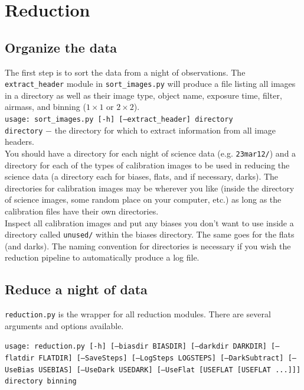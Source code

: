 \documentclass{article}
\begin{document}
\vspace{3 mm}
\section{Reduction}
\subsection{Organize the data}
The first step is to sort the data from a night of observations. 
The \texttt{extract\_header} module in \texttt{sort\_images.py} will
produce a file listing all images in a directory as well as their
image type, object name, exposure time, filter, airmass, and binning 
($1\times1$ or $2\times2$).\\

\texttt{usage: sort\_images.py [-h] [--extract\_header] directory} \\

\texttt{directory} $-$ \hangindent=2.7cm the directory for which to extract
information from all image headers.\\

\noindent You should have a directory for each night of science data (e.g.
\texttt{23mar12/}) and a directory for each of the types of calibration 
images to be used in reducing the science data (a directory each for 
biases, flats, and if necessary, darks). The directories for calibration 
images may be wherever you like (inside the
directory of science images, some random place on your computer, etc.)
as long as the calibration files have their own directories. \\

\noindent Inspect all calibration images and put any biases you don't 
want to use inside a directory called \texttt{unused/} within the biases 
directory. The same goes for the flats (and darks). The naming convention
for directories is necessary if you wish the reduction pipeline to 
automatically produce a log file. 

\subsection{Reduce a night of data}
\texttt{reduction.py} is the wrapper for all reduction modules. There 
are several arguments and options available.

\hangindent=3cm \texttt{usage: reduction.py [-h] [--biasdir BIASDIR] 
    [--darkdir DARKDIR] [--flatdir FLATDIR] [--SaveSteps] 
    [--LogSteps LOGSTEPS] [--DarkSubtract] [--UseBias USEBIAS] 
    [--UseDark USEDARK] [--UseFlat [USEFLAT [USEFLAT ...]]] directory binning}\\
\end{document}
